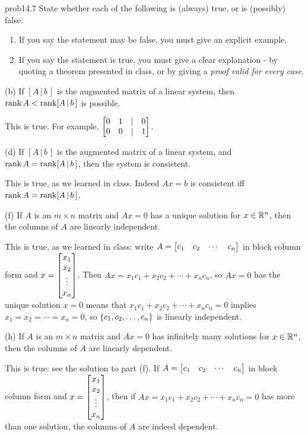 \begin{sol}{prob14.7} State whether each of the following is (always) true,
or is (possibly) false.    
   \smallskip    
\begin{enumerate}[$\bullet$]
\item If you say the statement may be false, you    must give an explicit example.   
\item If you say the statement is true, you must give a clear explanation -   by quoting a theorem presented in class, or by giving a {\it proof valid for every  case}. 
\end{enumerate}
\medskip

(b) If $[A\,|\,b\,]$ is the augmented matrix of a linear system, then $\operatorname{rank} A<\operatorname{rank}  [A\,|\,b\,]$ is possible.

\soln This is true. For example, $\bmatrix  0 & 1 &|& 0 \\
 0 & 0 &|& 1 \endbmatrix$.
\medskip
%


(d) If $[A\,|\,b\,]$ is the augmented matrix of a linear system, and $\operatorname{rank} A=\operatorname{rank}  [A\,|\,b\,]$, then the system  is consistent. 

\soln This is true, as we learned in class. Indeed $Ax=b$ is consistent iff $\operatorname{rank} A=\operatorname{rank}  [A\,|\,b\,]$.
 
%
\medskip

(f) If $A$ is an $m \times n$ matrix and $Ax=0$ has a unique solution for $x\in \mathbb{R}^n$, then the columns of $A$ are linearly independent.

\soln This is true, as we learned in class: write $A= \bmatrix c_1&c_2&\cdots &c_n\endbmatrix$ in block column form and $x= \bmatrix x_1\\x_2\\ \vdots\\x_n\endbmatrix$. Then $Ax= x_1 c_1 + x_2 c_2 +\cdots +x_nc_n$, so $Ax=0$ has the unique solution $x=0$ means that $x_1 c_1 + x_2 c_2 +\cdots +x_nc_n=0$ implies $x_1=x_2=\cdots=x_n=0$, so $ \{c_1, c_2, \dots, c_n  \}$ is linearly independent.
%
\medskip

(h) If $A$ is an $m \times n$ matrix and $Ax=0$ has infinitely many solutions for $x\in \mathbb{R}^n$, then the columns of $A$ are linearly dependent.

\soln This is true: see the solution to part (f). If $A= \bmatrix c_1&c_2&\cdots &c_n\endbmatrix$ in block column form and $x= \bmatrix x_1\\x_2\\ \vdots\\x_n\endbmatrix$, then if $Ax= x_1 c_1 + x_2 c_2 +\cdots +x_nc_n=0$ has more than one solution, the columns of $A$ are indeed dependent.
%
\medskip


\end{sol}
